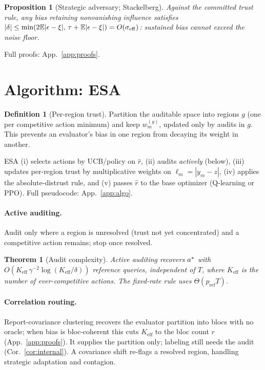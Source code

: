 \documentclass[11pt]{article}
\newtheorem{theorem}{Theorem}
\newtheorem{proposition}{Proposition}
\theoremstyle{definition}\newtheorem{definition}{Definition}
\theoremstyle{definition}\newtheorem{assumption}{Assumption}
\begin{document}
\begin{proposition}[Strategic adversary; Stackelberg]\label{prop:stackelberg}
Against the committed trust rule, any bias retaining nonvanishing influence satisfies
$|\delta|\le\min(2\mathbb{E}|\epsilon-\xi|,\,\tau+\mathbb{E}|\epsilon-\xi|)=O(\sigma_{\mathrm{eff}})$: sustained bias
cannot exceed the noise floor.
\end{proposition}

Full proofs: App.~\ref{app:proofs}.

\section{Algorithm: ESA}\label{sec:algo}
\begin{definition}[Per-region trust]\label{def:regiontrust}
Partition the auditable space into regions $g$ (one per competitive action minimum) and keep
$w_m^{(g)}$, updated only by audits in $g$. This prevents an evaluator's bias in one region from
decaying its weight in another.
\end{definition}

ESA (i) selects actions by UCB/policy on $\hat r$, (ii) audits \emph{actively} (below), (iii)
updates per-region trust by multiplicative weights on $\ell_m=|y_m-z|$, (iv) applies the
absolute-distrust rule, and (v) passes $\hat r$ to the base optimizer (Q-learning or PPO). Full
pseudocode: App.~\ref{app:algo}.

\paragraph{Active auditing.} Audit only where a region is unresolved (trust not yet concentrated) and
a competitive action remains; stop once resolved.
\begin{theorem}[Audit complexity]\label{thm:audit}
Active auditing recovers $a^{\ast}$ with $O(K_{\mathrm{eff}}\,\gamma^{-2}\log(K_{\mathrm{eff}}/\delta))$
reference queries, \emph{independent of $T$}, where $K_{\mathrm{eff}}$ is the number of
ever-competitive actions. The fixed-rate rule uses $\Theta(p_{\mathrm{ref}}T)$.
\end{theorem}

\paragraph{Correlation routing.} Report-covariance clustering recovers the evaluator partition into
blocs with no oracle; when bias is bloc-coherent this cuts $K_{\mathrm{eff}}$ to the bloc count $r$
(App.~\ref{app:proofs}). It supplies the partition only; labeling still needs the audit
(Cor.~\ref{cor:internal}). A covariance shift re-flags a resolved region, handling strategic
adaptation and contagion.
\end{document}
